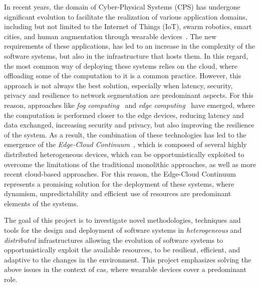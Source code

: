 \documentclass[12pt,a4paper]{article}
\begin{document}
In recent years,
the domain of Cyber-Physical Systems (CPS) has undergone significant evolution to facilitate the realization of various application domains,
including but not limited to the Internet of Things (IoT),
swarm robotics, smart cities, and human augmentation through wearable devices~\cite{DBLP:conf/aisi/JumaS19, DBLP:journals/sensors/LosetoSRGIFBL22}.
%
The new requirements of these applications,
has led to an increase in the complexity of the software systems,
but also in the infrastructure that hosts them.
%
In this regard,
the most common way of deploying these systems relies on the cloud,
where offloading some of the computation to it is a common practice.
%
However,
this approach is not always the best solution,
especially when latency, security, privacy and resilience to network segmentation are predominant aspects.
%
For this reason,
approaches like \emph{fog computing}~\cite{DBLP:journals/tjs/GasmiDTO22} and \emph{edge computing}~\cite{DBLP:journals/csur/KongTHCWJZKD23} have emerged,
where the computation is performed closer to the edge devices,
reducing latency and data exchanged, increasing security and privacy,
but also improving the resilience of the system.
%
As a result,
the combination of these technologies has led to the emergence of the \emph{Edge-Cloud Continuum}~\cite{DBLP:journals/iot/BittencourtISFM18},
which is composed of several highly distributed heterogeneous devices,
which can be opportunistically exploited to overcome the limitations of the traditional monolithic approaches,
as well as more recent cloud-based approaches.
%
For this reason,
the Edge-Cloud Continuum represents a promising solution for the deployment of these systems,
where dynamism,
unpredictability and efficient use of resources are predominant elements of the systems.

The goal of this project is to investigate novel methodologies,
techniques and tools for the design and deployment of software systems in \emph{heterogeneous} and \emph{distributed} infrastructures
allowing the evolution of software systems to opportunistically exploit the available resources,
to be resilient, efficient, and adaptive to the changes in the environment.
%
This project emphasizes solving the above issues in the context of \ac{cas},
where wearable devices cover a predominant role.
\end{document}
